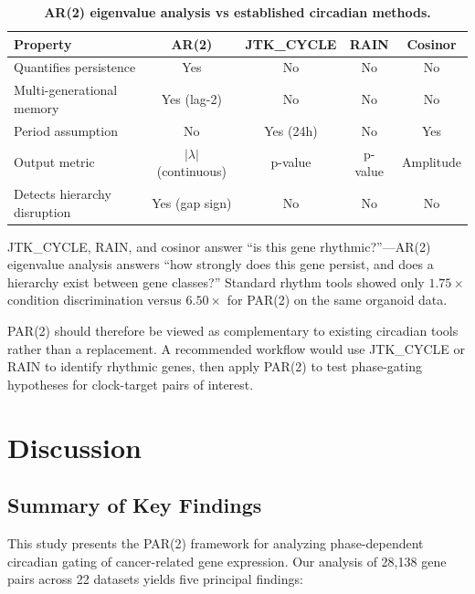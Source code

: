 \documentclass[11pt,a4paper]{article}
\begin{document}
\begin{table}[H]
\centering
\caption{\textbf{AR(2) eigenvalue analysis vs established circadian methods.}}
\begin{tabular}{@{}lcccc@{}}
\toprule
\textbf{Property} & \textbf{AR(2)} & \textbf{JTK\_CYCLE} & \textbf{RAIN} & \textbf{Cosinor} \\
\midrule
Quantifies persistence & Yes & No & No & No \\
Multi-generational memory & Yes (lag-2) & No & No & No \\
Period assumption & No & Yes (24h) & No & Yes \\
Output metric & $|\lambda|$ (continuous) & p-value & p-value & Amplitude \\
Detects hierarchy disruption & Yes (gap sign) & No & No & No \\
\bottomrule
\end{tabular}
\end{table}

JTK\_CYCLE, RAIN, and cosinor answer ``is this gene rhythmic?''---AR(2) eigenvalue analysis answers ``how strongly does this gene persist, and does a hierarchy exist between gene classes?'' Standard rhythm tools showed only $1.75\times$ condition discrimination versus $6.50\times$ for PAR(2) on the same organoid data.

PAR(2) should therefore be viewed as complementary to existing circadian tools rather than a replacement. A recommended workflow would use JTK\_CYCLE or RAIN to identify rhythmic genes, then apply PAR(2) to test phase-gating hypotheses for clock-target pairs of interest.

\section{Discussion}

\subsection{Summary of Key Findings}

This study presents the PAR(2) framework for analyzing phase-dependent circadian gating of cancer-related gene expression. Our analysis of 28,138 gene pairs across 22 datasets yields five principal findings:
\end{document}
